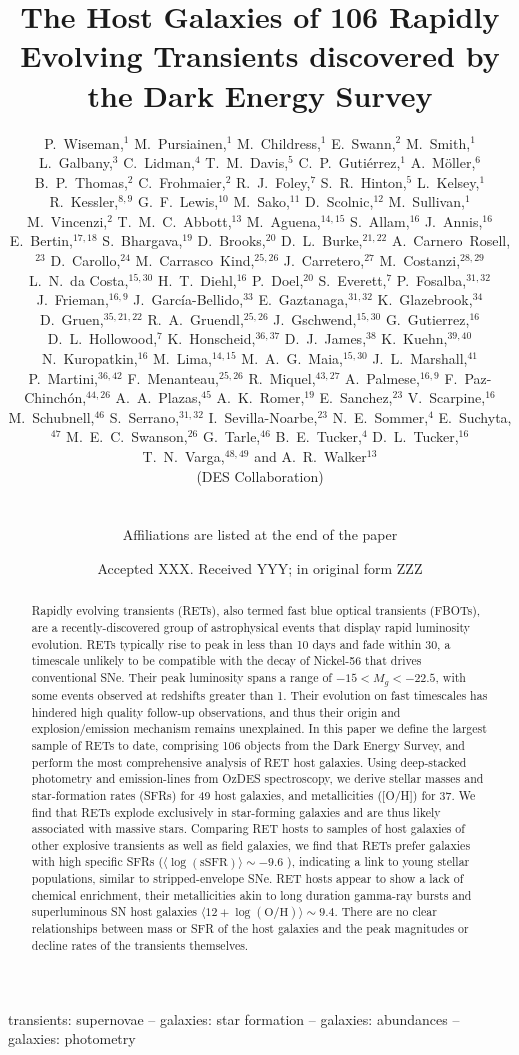 \documentclass[fleqn,usenatbib,]{mnras}
\title[RET host galaxies in DES]{The Host Galaxies of 106 Rapidly Evolving Transients discovered by the Dark Energy Survey}
\author[P. S. Wiseman]{
\parbox{\textwidth}{
\Large
P.~Wiseman,$^{1}$
M.~Pursiainen,$^{1}$
M.~Childress,$^{1}$
E.~Swann,$^{2}$
M.~Smith,$^{1}$
L.~Galbany,$^{3}$
C.~Lidman,$^{4}$
T.~M.~Davis,$^{5}$
C.~P.~Guti\'errez,$^{1}$
A.~M\"oller,$^{6}$
B.~P.~Thomas,$^{2}$
C.~Frohmaier,$^{2}$
R.~J.~Foley,$^{7}$
S.~R.~Hinton,$^{5}$
L.~Kelsey,$^{1}$
R.~Kessler,$^{8,9}$
G.~F.~Lewis,$^{10}$
M.~Sako,$^{11}$
D.~Scolnic,$^{12}$
M.~Sullivan,$^{1}$
M.~Vincenzi,$^{2}$
T.~M.~C.~Abbott,$^{13}$
M.~Aguena,$^{14,15}$
S.~Allam,$^{16}$
J.~Annis,$^{16}$
E.~Bertin,$^{17,18}$
S.~Bhargava,$^{19}$
D.~Brooks,$^{20}$
D.~L.~Burke,$^{21,22}$
A.~Carnero~Rosell,$^{23}$
D.~Carollo,$^{24}$
M.~Carrasco~Kind,$^{25,26}$
J.~Carretero,$^{27}$
M.~Costanzi,$^{28,29}$
L.~N.~da Costa,$^{15,30}$
H.~T.~Diehl,$^{16}$
P.~Doel,$^{20}$
S.~Everett,$^{7}$
P.~Fosalba,$^{31,32}$
J.~Frieman,$^{16,9}$
J.~Garc\'ia-Bellido,$^{33}$
E.~Gaztanaga,$^{31,32}$
K.~Glazebrook,$^{34}$
D.~Gruen,$^{35,21,22}$
R.~A.~Gruendl,$^{25,26}$
J.~Gschwend,$^{15,30}$
G.~Gutierrez,$^{16}$
D.~L.~Hollowood,$^{7}$
K.~Honscheid,$^{36,37}$
D.~J.~James,$^{38}$
K.~Kuehn,$^{39,40}$
N.~Kuropatkin,$^{16}$
M.~Lima,$^{14,15}$
M.~A.~G.~Maia,$^{15,30}$
J.~L.~Marshall,$^{41}$
P.~Martini,$^{36,42}$
F.~Menanteau,$^{25,26}$
R.~Miquel,$^{43,27}$
A.~Palmese,$^{16,9}$
F.~Paz-Chinch\'{o}n,$^{44,26}$
A.~A.~Plazas,$^{45}$
A.~K.~Romer,$^{19}$
E.~Sanchez,$^{23}$
V.~Scarpine,$^{16}$
M.~Schubnell,$^{46}$
S.~Serrano,$^{31,32}$
I.~Sevilla-Noarbe,$^{23}$
N.~E.~Sommer,$^{4}$
E.~Suchyta,$^{47}$
M.~E.~C.~Swanson,$^{26}$
G.~Tarle,$^{46}$
B.~E.~Tucker,$^{4}$
D.~L.~Tucker,$^{16}$
T.~N.~Varga,$^{48,49}$
and A.~R.~Walker$^{13}$
\begin{center} (DES Collaboration) \end{center}
}
\vspace{0.4cm}
\\
\parbox{\textwidth}{Affiliations are listed at the end of the paper}
}
\date{Accepted XXX. Received YYY; in original form ZZZ}
\newcommand{\replyref}[1]{\color{magenta}#1 \color{black}}
\begin{document}
\label{firstpage}
\pagerange{\pageref{firstpage}--\pageref{lastpage}}
\maketitle

\begin{abstract}
Rapidly evolving transients (RETs), also termed fast blue optical transients (FBOTs), are a recently-discovered group of astrophysical events that display rapid luminosity evolution. RETs typically rise to peak in less than 10 days and fade within 30, a timescale unlikely to be compatible with the decay of Nickel-56 that drives conventional SNe. Their peak luminosity spans a range of $-15 <M_g<-22.5$, with some events observed at redshifts greater than 1. Their evolution on fast timescales has hindered high quality follow-up observations, and thus their origin and explosion/emission mechanism remains unexplained. In this paper we define the largest sample of RETs to date, comprising 106 objects from the Dark Energy Survey, and perform the most comprehensive analysis of RET host galaxies. Using deep-stacked photometry and emission-lines from OzDES spectroscopy, we derive stellar masses and star-formation rates (SFRs) for 49 host galaxies, and metallicities ([O/H]) for 37. We find that RETs explode exclusively in star-forming galaxies and are thus likely associated with massive stars. Comparing RET hosts to samples of host galaxies of other explosive transients as well as field galaxies, we find that RETs prefer galaxies with high specific SFRs ($\langle\log \left(\mathrm{sSFR}\right)\rangle \sim -9.6$ ), indicating a link to young stellar populations, similar to stripped-envelope SNe. RET hosts appear to show a lack of chemical enrichment, their metallicities akin to long duration gamma-ray bursts and superluminous SN host galaxies $\langle12+\log\left(\mathrm{O/H}\right) \rangle \sim 9.4$. There are no clear relationships between \replyref{mass or SFR} of the host galaxies and the peak magnitudes or decline rates of the transients themselves.

\end{abstract}

\begin{keywords}
transients: supernovae -- galaxies: star formation -- galaxies: abundances -- galaxies: photometry 
\end{keywords}
\end{document}
